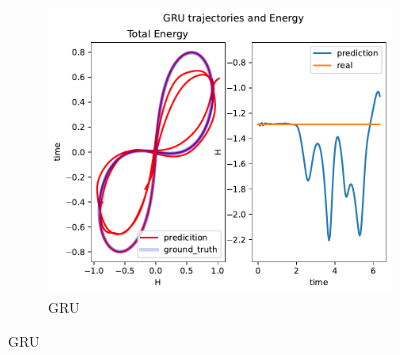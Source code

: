 \begin{figure}[H]
	\begin{subfigure}[b]{0.3\textwidth}
		\centering
		\includegraphics[width=\textwidth]{chapters/chapter5/body3_gru_traj.pdf}
		\caption{GRU}
	\end{subfigure}
	
	\vspace{0.5cm} %
	

\end{figure}
